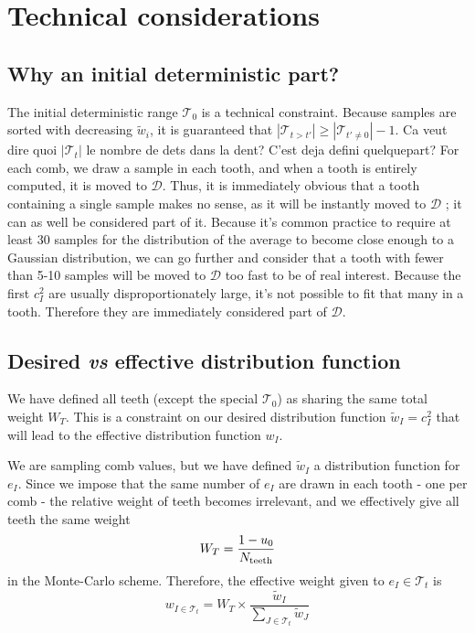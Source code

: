 \documentclass[./thesis.tex]{subfiles}
\begin{document}
\section{Technical considerations}


\subsection{Why an initial deterministic part?}

The initial deterministic range $\mathcal{T}_0$ is a technical constraint.
Because samples are sorted with decreasing $\tilde w_i$, it is guaranteed that $|\mathcal{T}_{t>t'}| \geq |\mathcal{T}_{t' \neq 0}|-1$. \alert{ Ca veut dire quoi $|\mathcal{T}_t|$ le nombre de dets dans la dent? C'est deja defini quelquepart? }
For each comb, we draw a sample in each tooth, and when a tooth is entirely computed, it is moved to $\mathcal{D}$. Thus, it is immediately obvious that a tooth containing a single sample makes no sense, as it will be instantly moved to $\mathcal{D}$ ; it can as well be considered part of it. Because it's common practice to require at least 30 samples for the distribution of the average to become close enough to a Gaussian distribution, we can go further and consider that a tooth with fewer than 5-10 samples will be moved to $\mathcal{D}$ too fast to be of real interest. Because the first $c_I^2$ are usually disproportionately large, it's not possible to fit that many in a tooth. Therefore they are immediately considered part of $\mathcal{D}$.

\subsection{Desired \textit{vs} effective distribution function}

We have defined all teeth (except the special $\mathcal{T}_0$) as sharing the same total weight $W_T$. This is a constraint on our desired distribution function $\tilde w_I = c_I^2$ that will lead to the effective distribution function $w_I$.

We are sampling comb values, but we have defined $\tilde w_I$ a distribution function for $e_I$. Since we impose that the same number of $e_I$ are drawn in each tooth - one per comb - the relative weight of teeth becomes irrelevant, and we effectively give all teeth the same weight 
\begin{equation}
W_T=\frac{1-u_0}{N_\text{teeth}}
\end{equation}
in the Monte-Carlo scheme. Therefore, the effective weight given to $e_I \in \mathcal{T}_t$ is
\begin{equation}
w_{I \in \mathcal{T}_t} = W_T \times \frac{\tilde w_I}{\sum_{J \in \mathcal{T}_t} \tilde w_J}
\end{equation}
\end{document}
